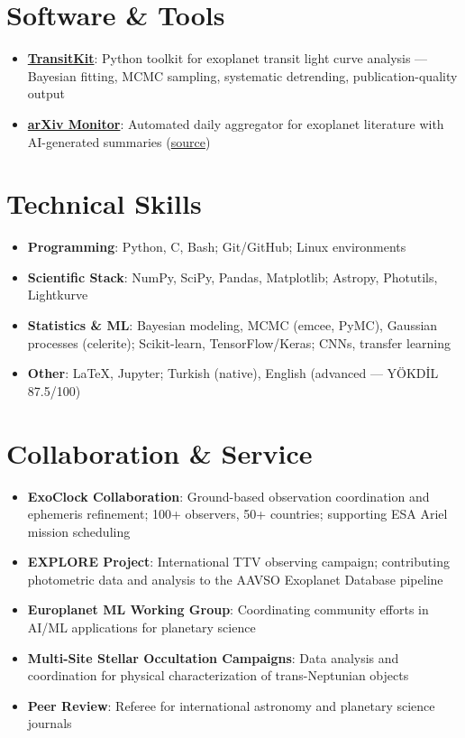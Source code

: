 \documentclass[11pt,a4paper]{article}
\begin{document}
\section{Software \& Tools}
\begin{itemize}
    \item \textbf{\href{https://github.com/ArifSolmaz}{TransitKit}}: Python toolkit for exoplanet transit light curve analysis --- Bayesian fitting, MCMC sampling, systematic detrending, publication-quality output
    \item \textbf{\href{https://arifsolmaz.github.io/arxiv}{arXiv Monitor}}: Automated daily aggregator for exoplanet literature with AI-generated summaries (\href{https://github.com/ArifSolmaz/arifsolmaz.github.io}{source})
\end{itemize}

\section{Technical Skills}
\begin{itemize}
    \item \textbf{Programming}: Python, C, Bash; Git/GitHub; Linux environments
    \item \textbf{Scientific Stack}: NumPy, SciPy, Pandas, Matplotlib; Astropy, Photutils, Lightkurve
    \item \textbf{Statistics \& ML}: Bayesian modeling, MCMC (emcee, PyMC), Gaussian processes (celerite); Scikit-learn, TensorFlow/Keras; CNNs, transfer learning
    \item \textbf{Other}: LaTeX, Jupyter; Turkish (native), English (advanced --- YÖKDİL 87.5/100)
\end{itemize}

\section{Collaboration \& Service}
\begin{itemize}
    \item \textbf{ExoClock Collaboration}: Ground-based observation coordination and ephemeris refinement; 100+ observers, 50+ countries; supporting ESA Ariel mission scheduling
    \item \textbf{EXPLORE Project}: International TTV observing campaign; contributing photometric data and analysis to the AAVSO Exoplanet Database pipeline
    \item \textbf{Europlanet ML Working Group}: Coordinating community efforts in AI/ML applications for planetary science
    \item \textbf{Multi-Site Stellar Occultation Campaigns}: Data analysis and coordination for physical characterization of trans-Neptunian objects
    \item \textbf{Peer Review}: Referee for international astronomy and planetary science journals
\end{itemize}
\end{document}
